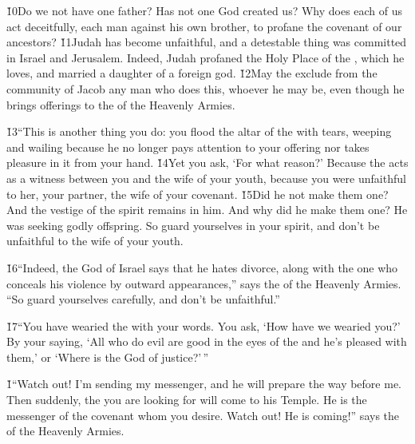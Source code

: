 \v{10}Do we not have one father? Has not one God created us? Why does each of us act deceitfully, each man against his own brother, to profane the covenant of our ancestors? \v{11}Judah has become unfaithful, and a detestable thing was committed in Israel and Jerusalem. Indeed, Judah profaned the Holy Place of the , which he loves, and married a daughter of a foreign god. \v{12}May the  exclude from the community of Jacob any man who does this, whoever he may be, even though he brings offerings to the  of the Heavenly Armies.

\v{13}``This is another thing you do: you flood the altar of the  with tears, weeping and wailing because he no longer pays attention to your offering nor takes pleasure in it from your hand. \v{14}Yet you ask, `For what reason?' Because the  acts as a witness between you and the wife of your youth, because you were unfaithful to her, your partner, the wife of your covenant. \v{15}Did he not make them one? And the vestige of the spirit remains in him. And why did he make them one? He was seeking godly offspring. So guard yourselves in your spirit, and don't be unfaithful to the wife of your youth.

\v{16}``Indeed, the  God of Israel says that he hates divorce, along with the one who conceals his violence by outward appearances,'' says the  of the Heavenly Armies. ``So guard yourselves carefully, and don't be unfaithful.''

\v{17}``You have wearied the  with your words. You ask, `How have we wearied you?' By your saying, `All who do evil are good in the eyes of the  and he's pleased with them,' or `Where is the God of justice?'\,''

\v{1}``Watch out! I'm sending my messenger, and he will prepare the way before me. Then suddenly, the  you are looking for will come to his Temple. He is the messenger of the covenant whom you desire. Watch out! He is coming!'' says the  of the Heavenly Armies.

